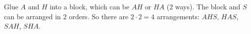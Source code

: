 Glue $A$ and $H$ into a block, which can be $AH$ or $HA$ ($2$ ways). The block and $S$ can be arranged in $2$ orders. So there are $2\cdot2=\boxed{4}$ arrangements: $AHS$, $HAS$, $SAH$, $SHA$.
